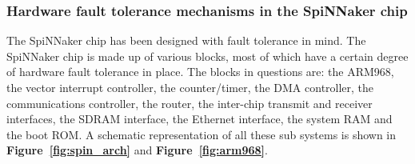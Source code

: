 \documentclass[a4paper, 11pt]{article}
\begin{document}

\subsubsection{Hardware fault tolerance mechanisms in the SpiNNaker chip}
The SpiNNaker chip has been designed with fault tolerance in mind. The SpiNNaker chip is made up of various blocks, most of which have a certain degree of hardware fault tolerance in place. The blocks in questions are: the ARM968, the vector interrupt controller, the counter/timer, the DMA controller, the communications controller, the router, the inter-chip transmit and receiver interfaces, the SDRAM interface, the Ethernet interface, the system RAM and the boot ROM. A schematic representation of all these sub systems is shown in \textbf{Figure~\ref{fig:spin_arch}} and \textbf{Figure~\ref{fig:arm968}}.
\end{document}
